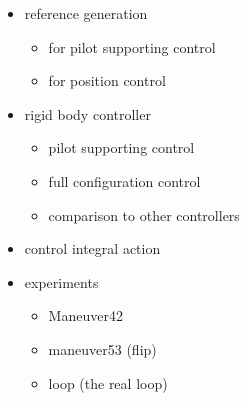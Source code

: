 \begin{itemize}
 \item reference generation
 \begin{itemize}
  \item for pilot supporting control
  \item for position control
 \end{itemize}
 \item rigid body controller
 \begin{itemize}
  \item pilot supporting control
  \item full configuration control
  \item comparison to other controllers
 \end{itemize}
 \item control integral action
 \item experiments
 \begin{itemize}
  \item Maneuver42
  \item maneuver53 (flip)
  \item loop (the real loop)
 \end{itemize}
\end{itemize}
